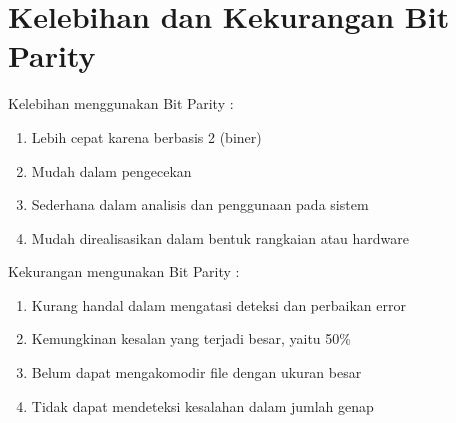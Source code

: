 \section{Kelebihan dan Kekurangan Bit Parity}

Kelebihan menggunakan Bit Parity :

\begin{enumerate}
\item Lebih cepat karena berbasis 2 (biner)
\item Mudah dalam pengecekan
\item Sederhana dalam analisis dan penggunaan pada sistem
\item Mudah direalisasikan dalam bentuk rangkaian atau hardware
\end{enumerate}

\hfill \break

Kekurangan mengunakan Bit Parity :

\begin{enumerate}
\item Kurang handal dalam mengatasi deteksi dan perbaikan error
\item Kemungkinan kesalan yang terjadi besar, yaitu 50\%
\item Belum dapat mengakomodir file dengan ukuran besar
\item Tidak dapat mendeteksi kesalahan dalam jumlah genap
\end{enumerate}



